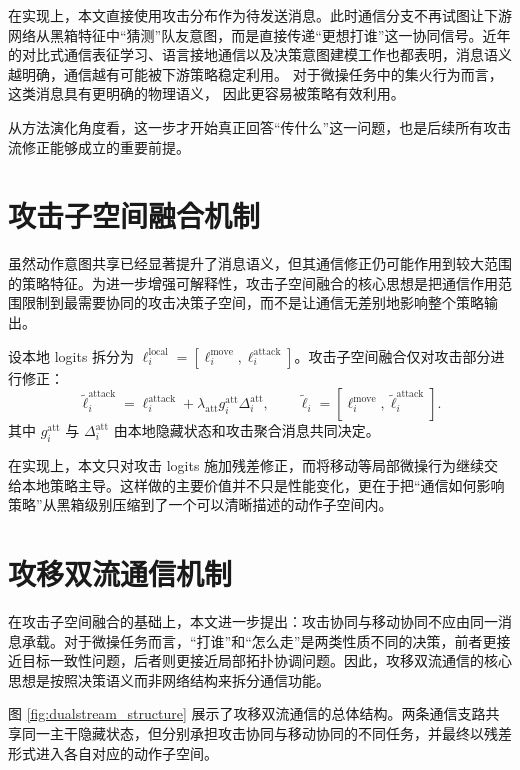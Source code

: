 在实现上，本文直接使用攻击分布作为待发送消息。此时通信分支不再试图让下游网络从黑箱特征中“猜测”队友意图，而是直接传递“更想打谁”这一协同信号。近年的对比式通信表征学习、语言接地通信以及决策意图建模工作也都表明，消息语义越明确，通信越有可能被下游策略稳定利用\cite{lo2024learning,li2024languagegroundedmarl,zhang2025decisionintention}。
对于微操任务中的集火行为而言，
这类消息具有更明确的物理语义，
因此更容易被策略有效利用。

从方法演化角度看，这一步才开始真正回答“传什么”这一问题，也是后续所有攻击流修正能够成立的重要前提。

\section{攻击子空间融合机制}

虽然动作意图共享已经显著提升了消息语义，但其通信修正仍可能作用到较大范围的策略特征。为进一步增强可解释性，攻击子空间融合的核心思想是把通信作用范围限制到最需要协同的攻击决策子空间，而不是让通信无差别地影响整个策略输出。

设本地 logits 拆分为 \(\ell_i^{\text{local}}=[\ell_i^{\text{move}},\ell_i^{\text{attack}}]\)。攻击子空间融合仅对攻击部分进行修正：
\begin{equation}
\tilde{\ell}_i^{\text{attack}}=
\ell_i^{\text{attack}}+\lambda_{\text{att}}g_i^{\text{att}}\Delta_i^{\text{att}},
\qquad
\tilde{\ell}_i=
\left[
\ell_i^{\text{move}},
\tilde{\ell}_i^{\text{attack}}
\right].
\end{equation}
其中 \(g_i^{\text{att}}\) 与 \(\Delta_i^{\text{att}}\) 由本地隐藏状态和攻击聚合消息共同决定。

在实现上，本文只对攻击 logits 施加残差修正，而将移动等局部微操行为继续交给本地策略主导。这样做的主要价值并不只是性能变化，更在于把“通信如何影响策略”从黑箱级别压缩到了一个可以清晰描述的动作子空间内。

\section{攻移双流通信机制}

在攻击子空间融合的基础上，本文进一步提出：攻击协同与移动协同不应由同一消息承载。对于微操任务而言，“打谁”和“怎么走”是两类性质不同的决策，前者更接近目标一致性问题，后者则更接近局部拓扑协调问题。因此，攻移双流通信的核心思想是按照决策语义而非网络结构来拆分通信功能。

图 \ref{fig:dualstream_structure} 展示了攻移双流通信的总体结构。两条通信支路共享同一主干隐藏状态，但分别承担攻击协同与移动协同的不同任务，并最终以残差形式进入各自对应的动作子空间。

